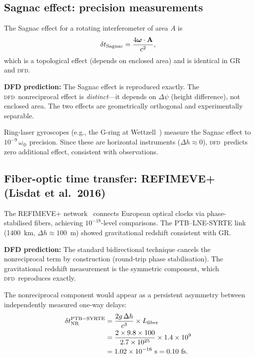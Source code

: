 \documentclass[aps,prl,twocolumn,superscriptaddress,showpacs]{revtex4-2}
\newcommand{\DFD}{\textsc{dfd}}
\begin{document}
\subsection{Sagnac effect: precision measurements}

The Sagnac effect for a rotating interferometer of area $A$ is
\begin{equation}
\delta t_{\rm Sagnac} = \frac{4\boldsymbol{\omega}\cdot\mathbf{A}}{c^2},
\end{equation}
which is a topological effect (depends on enclosed area) and is
identical in GR and \DFD.

\textbf{DFD prediction:}  The Sagnac effect is reproduced exactly.
The \DFD\ nonreciprocal effect is \emph{distinct}---it depends on
$\Delta\psi$ (height difference), not enclosed area.  The two
effects are geometrically orthogonal and experimentally separable.

Ring-laser gyroscopes (e.g., the G-ring at Wettzell~\cite{Schreiber2004})
measure the Sagnac effect to $10^{-9}\,\omega_\oplus$ precision.
Since these are horizontal instruments ($\Delta h \approx 0$), \DFD\
predicts zero additional effect, consistent with observations.

\subsection{Fiber-optic time transfer: REFIMEVE+ (Lisdat et al.\ 2016)}

The REFIMEVE+ network~\cite{Lisdat2016} connects European optical
clocks via phase-stabilised fibers, achieving $10^{-18}$-level
comparisons.  The PTB--LNE-SYRTE link (1400~km, $\Delta h \approx 100$~m)
showed gravitational redshift consistent with GR.

\textbf{DFD prediction:}  The standard bidirectional technique
cancels the nonreciprocal term by construction (round-trip
phase stabilisation).  The gravitational redshift measurement
is the symmetric component, which \DFD\ reproduces exactly.

The nonreciprocal component would appear as a persistent
asymmetry between independently measured one-way delays:
\begin{align}
\delta t_{\rm NR}^{\rm PTB-SYRTE} &= \frac{2g\,\Delta h}{c^3}
\times L_{\rm fiber} \nonumber\\
&= \frac{2\times 9.8\times 100}{2.7\times 10^{25}}
\times 1.4\times 10^9 \nonumber\\
&= 1.02\times 10^{-16}~\text{s} = 0.10~\text{fs}.
\label{eq:PTB_SYRTE}
\end{align}
\end{document}

